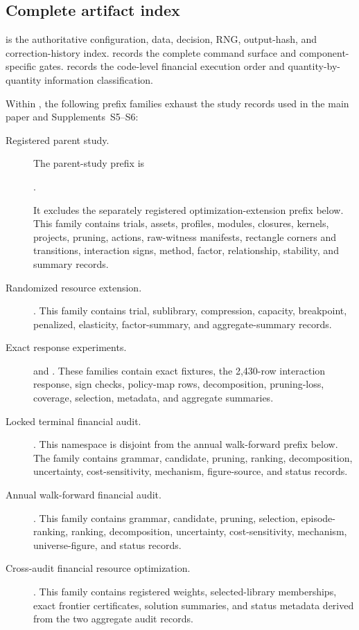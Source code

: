\subsection{Complete artifact index}

 is the authoritative configuration, data,
decision, RNG, output-hash, and correction-history index.
 records the complete command surface and
component-specific gates.   records
the code-level financial execution order and quantity-by-quantity information
classification.

Within , the following prefix families
exhaust the study records used in the main paper and Supplements~S5--S6:
\begin{description}
  \item[Registered parent study.]
  The parent-study prefix is
  \begin{center}
  .
  \end{center}
  It excludes the separately registered optimization-extension prefix below.
  This family contains trials, assets,
  profiles, modules, closures, kernels, projects, pruning, actions, raw-witness
  manifests, rectangle corners and transitions, interaction signs, method,
  factor, relationship, stability, and summary records.
  \item[Randomized resource extension.]
  .  This family contains trial,
  sublibrary, compression, capacity, breakpoint, penalized, elasticity,
  factor-summary, and aggregate-summary records.
  \item[Exact response experiments.]
   and .  These
  families contain exact fixtures, the 2,430-row interaction response, sign
  checks, policy-map rows, decomposition, pruning-loss, coverage, selection,
  metadata, and aggregate summaries.
  \item[Locked terminal financial audit.]
  .  This namespace is disjoint from the
  annual walk-forward prefix below.  The
  family contains grammar, candidate, pruning, ranking, decomposition,
  uncertainty, cost-sensitivity, mechanism, figure-source, and status records.
  \item[Annual walk-forward financial audit.]
  .  This family contains grammar,
  candidate, pruning, selection, episode-ranking, ranking, decomposition,
  uncertainty, cost-sensitivity, mechanism, universe-figure, and status
  records.
  \item[Cross-audit financial resource optimization.]
  .  This family contains registered
  weights, selected-library memberships, exact frontier certificates,
  solution summaries, and status metadata derived from the two aggregate
  audit records.
\end{description}

